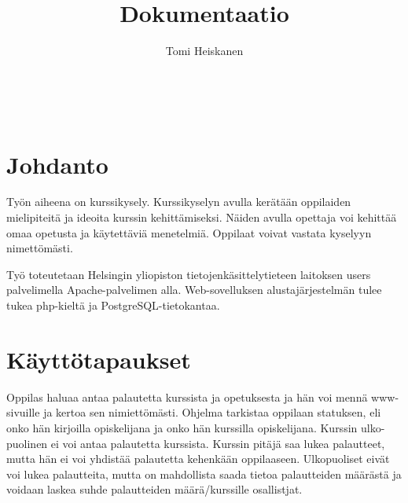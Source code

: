 \documentclass[12pt,twoside,a4paper,leqno,titlepage]{article}
\title{Dokumentaatio}
\author{Tomi Heiskanen}
\begin{document}
\maketitle

\ 
\thispagestyle{empty}
\newpage

\setcounter{page}{1}
\tableofcontents
\thispagestyle{empty}

\newpage
\section{Johdanto}

Työn aiheena on kurssikysely. Kurssikyselyn avulla kerätään oppilaiden
mielipiteitä ja ideoita kurssin kehittämiseksi. Näiden avulla opettaja voi
kehittää omaa opetusta ja käytettäviä menetelmiä. Oppilaat voivat vastata
kyselyyn nimettömästi.

Työ toteutetaan Helsingin yliopiston tietojenkäsittelytieteen laitoksen users
palvelimella Apache-palvelimen alla. Web-sovelluksen alustajärjestelmän tulee
tukea php-kieltä ja PostgreSQL-tietokantaa.

\section{Käyttötapaukset}

Oppilas haluaa antaa palautetta kurssista ja opetuksesta ja hän voi mennä www-
sivuille ja kertoa sen nimiettömästi. Ohjelma tarkistaa oppilaan statuksen, eli
onko hän kirjoilla opiskelijana ja onko hän kurssilla opiskelijana. Kurssin ulko-
puolinen ei voi antaa palautetta kurssista. Kurssin pitäjä saa lukea palautteet,
mutta hän ei voi yhdistää palautetta kehenkään oppilaaseen. Ulkopuoliset eivät
voi lukea palautteita, mutta on mahdollista saada tietoa palautteiden määrästä
ja voidaan laskea suhde palautteiden määrä/kurssille osallistjat.
\end{document}
